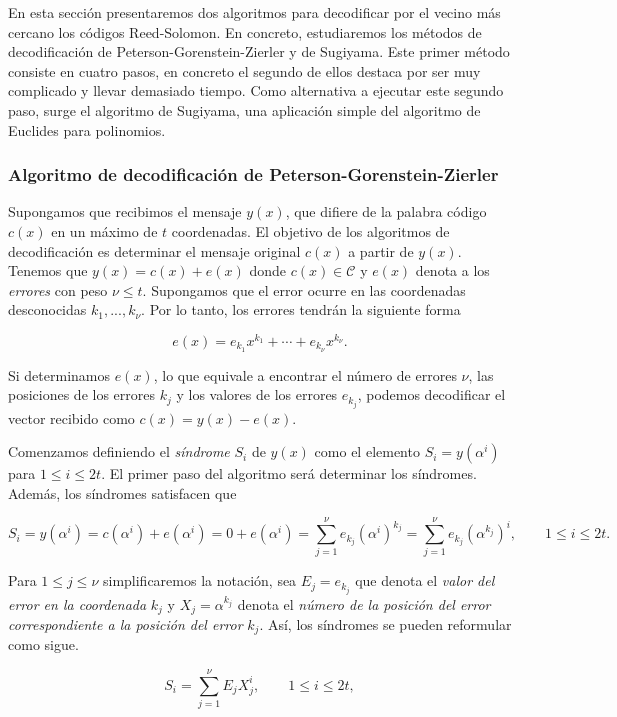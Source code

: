 En esta sección presentaremos dos algoritmos para decodificar por el vecino más cercano los códigos Reed-Solomon. En concreto, estudiaremos los métodos de decodificación de Peterson-Gorenstein-Zierler y de Sugiyama. Este primer método consiste en cuatro pasos, en concreto el segundo de ellos destaca por ser muy complicado y llevar demasiado tiempo. Como alternativa a ejecutar este segundo paso, surge el algoritmo de Sugiyama, una aplicación simple del algoritmo de Euclides para polinomios.

\subsubsection{Algoritmo de decodificación de Peterson-Gorenstein-Zierler}

Supongamos que recibimos el mensaje $y(x)$, que difiere de la palabra código $c(x)$ en un máximo de $t$ coordenadas. El objetivo de los algoritmos de decodificación es determinar el mensaje original $c(x)$ a partir de $y(x)$. Tenemos que $y(x) = c(x) + e(x)$ donde $c(x) \in \mathcal{C}$ y $e(x)$ denota a los \emph{errores} con peso $\nu \leq t$. Supongamos que el error ocurre en las coordenadas desconocidas $k_1, ..., k_\nu$. Por lo tanto, los errores tendrán la siguiente forma

$$e(x) = e_{k_1} x^{k_1} + \cdots + e_{k_{\nu}} x^{k_{\nu}}.$$

Si determinamos $e(x)$, lo que equivale a encontrar el número de errores $\nu$, las posiciones de los errores $k_j$ y los valores de los errores $e_{k_j}$, podemos decodificar el vector recibido como $c(x) = y(x) - e(x)$.

Comenzamos definiendo el \emph{síndrome} $S_i$ de $y(x)$ como el elemento $S_i = y \left( \alpha^i \right)$ para $1 \leq i \leq 2t$. El primer paso del algoritmo será determinar los síndromes. Además, los síndromes satisfacen que

$$S_i = y (\alpha^i) = c (\alpha^i) + e (\alpha^i) = 0 + e (\alpha^i) = \sum_{j=1}^{\nu} e_{k_j} (\alpha^i) ^{k_j} = \sum_{j=1}^{\nu} e_{k_j} (\alpha^{k_j}) ^i, \qquad 1 \leq i \leq 2t.$$

Para $1 \leq j \leq \nu$ simplificaremos la notación, sea $E_j = e_{k_j}$ que denota el \emph{valor del error en la coordenada} $k_j$ y $X_j = \alpha^{k_j}$ denota el \emph{número de la posición del error correspondiente a la posición del error} $k_j$. Así, los síndromes se pueden reformular como sigue.

\begin{equation}
    \label{prop:sindromes_peterson}
    S_i = \sum_{j=1}^{\nu} E_j X_j^i, \qquad 1 \leq i \leq 2t,
\end{equation}

